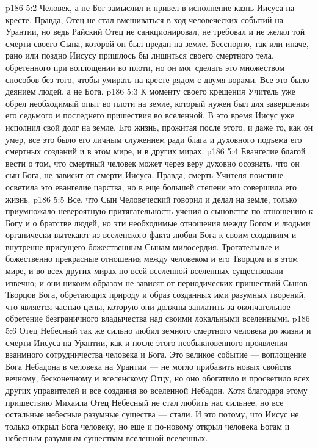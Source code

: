 \vs p186 5:2 Человек, а не Бог замыслил и привел в исполнение казнь Иисуса на кресте. Правда, Отец не стал вмешиваться в ход человеческих событий на Урантии, но ведь Райский Отец не санкционировал, не требовал и не желал той смерти своего Сына, которой он был предан на земле. Бесспорно, так или иначе, рано или поздно Иисусу пришлось бы лишиться своего смертного тела, обретенного при воплощении во плоти, но он мог сделать это множеством способов без того, чтобы умирать на кресте рядом с двумя ворами. Все это было деянием людей, а не Бога.
\vs p186 5:3 К моменту своего крещения Учитель уже обрел необходимый опыт во плоти на земле, который нужен был для завершения его седьмого и последнего пришествия во вселенной. В это время Иисус уже исполнил свой долг на земле. Его жизнь, прожитая после этого, и даже то, как он умер, все это было его личным служением ради блага и духовного подъема его смертных созданий и в этом мире, и в других мирах.
\vs p186 5:4 Евангелие благой вести о том, что смертный человек может через веру духовно осознать, что он сын Бога, не зависит от смерти Иисуса. Правда, смерть Учителя поистине осветила это евангелие царства, но в еще большей степени это совершила его жизнь.
\vs p186 5:5 Все, что Сын Человеческий говорил и делал на земле, только приумножало невероятную притягательность учения о сыновстве по отношению к Богу и о братстве людей, но эти необходимые отношения между Богом и людьми органически вытекают из вселенского факта любви Бога к своим созданиям и внутренне присущего божественным Сынам милосердия. Трогательные и божественно прекрасные отношения между человеком и его Творцом и в этом мире, и во всех других мирах по всей вселенной вселенных существовали извечно; и они никоим образом не зависят от периодических пришествий Сынов\hyp{}Творцов Бога, обретающих природу и образ созданных ими разумных творений, что является частью цены, которую они должны заплатить за окончательное обретение безграничного владычества над своими локальными вселенными.
\vs p186 5:6 Отец Небесный так же сильно любил земного смертного человека до жизни и смерти Иисуса на Урантии, как и после этого необыкновенного проявления взаимного сотрудничества человека и Бога. Это великое событие --- воплощение Бога Небадона в человека на Урантии --- не могло прибавить новых свойств вечному, бесконечному и вселенскому Отцу, но оно обогатило и просветило всех других управителей и все создания во вселенной Небадон. Хотя благодаря этому пришествию Михаила Отец Небесный не стал любить нас сильнее, но все остальные небесные разумные существа --- стали. И это потому, что Иисус не только открыл Бога человеку, но еще и по\hyp{}новому открыл человека Богам и небесным разумным существам вселенной вселенных.
